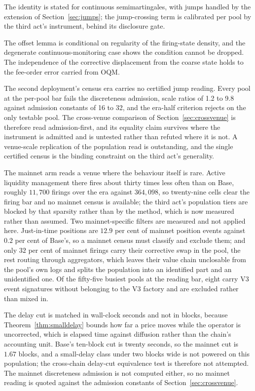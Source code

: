 \documentclass[11pt,a4paper]{article}
\theoremstyle{definition}
\theoremstyle{plain}
\theoremstyle{remark}
\begin{document}
The identity is stated for continuous semimartingales, with jumps handled by the extension of Section~\ref{sec:jumps}; the jump-crossing term is calibrated per pool by the third act's 
instrument, behind its disclosure gate.

The offset lemma is conditional on regularity of the firing-state density, and the degenerate continuous-monitoring case shows the condition cannot be dropped. The independence of the 
corrective displacement from the coarse state holds to the fee-order error carried from OQM.

The second deployment's census era carries no certified jump reading. Every pool at the per-pool bar fails the discreteness admission, scale ratios of 1.2 to 9.8 against admission 
constants of 16 to 32, and the era-half criterion rejects on the only testable pool. The cross-venue comparison of Section~\ref{sec:crossvenue} is therefore read admission-first, and 
its equality claim survives where the instrument is admitted and is untested rather than refuted where it is not. A venue-scale replication of the population read is outstanding, and 
the single certified census is the binding constraint on the third act's generality.

The mainnet arm reads a venue where the behaviour itself is rare. Active liquidity management there fires about thirty times less often than on Base, roughly $11{,}700$ firings over 
the era against $364{,}098$, so twenty-nine cells clear the firing bar and no mainnet census is available; the third act's population tiers are blocked by that sparsity rather than by 
the method, which is now measured rather than assumed. Two mainnet-specific filters are measured and not applied here. Just-in-time positions are $12.9$ per cent of mainnet position 
events against $0.2$ per cent of Base's, so a mainnet census must classify and exclude them; and only $32$ per cent of mainnet firings carry their corrective swap in the pool, the rest 
routing through aggregators, which leaves their value chain unclosable from the pool's own logs and splits the population into an identified part and an unidentified one. Of the fifty-five 
busiest pools at the reading bar, eight carry V3 event signatures without belonging to the V3 factory and are excluded rather than mixed in.

The delay cut is matched in wall-clock seconds and not in blocks, because Theorem~\ref{thm:smalldelay} bounds how far a price moves while the operator is uncorrected, which is elapsed 
time against diffusion rather than the chain's accounting unit. Base's ten-block cut is twenty seconds, so the mainnet cut is $1.67$ blocks, and a small-delay class under two blocks wide is 
not powered on this population; the cross-chain delay-cut equivalence test is therefore not attempted. The mainnet discreteness admission is not computed either, so no mainnet reading is 
quoted against the admission constants of Section~\ref{sec:crossvenue}.
\end{document}
